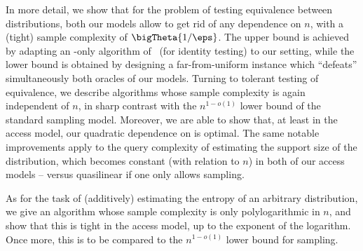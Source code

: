   In more detail, we show that for the problem of testing equivalence between distributions, both our models allow to get rid of any dependence on $n$, with a (tight) sample complexity of $\bigTheta{1/\eps}$. The upper bound is achieved by adapting an \EVAL-only algorithm of~\cite{RS:09} (for identity testing) to our setting, while the lower bound is obtained by designing a far-from-uniform instance which ``defeats'' simultaneously both oracles of our models. Turning to tolerant testing of equivalence, we describe algorithms whose sample complexity is again independent of $n$, in sharp contrast with the $n^{1-o(1)}$ lower bound of the standard sampling model. Moreover, we are able to show that, at least in the \Pdfsamp access model, our quadratic dependence on \eps is optimal. The same notable improvements apply to the query complexity of estimating the support size of the distribution, which becomes constant (with relation to $n$) in both of our access models -- versus quasilinear if one only allows sampling.
  
  As for the task of (additively) estimating the entropy of an arbitrary distribution, we give an algorithm whose sample complexity is only polylogarithmic in $n$, and show that this is tight in the \Pdfsamp access model, up to the exponent of the logarithm. Once more, this is to be compared to the $n^{1-o(1)}$ lower bound for sampling.
  
